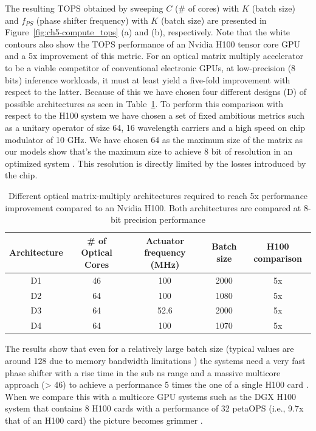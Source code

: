 The resulting TOPS obtained by sweeping $C$ (\# of cores) with $K$ (batch size) and $f_{PS}$ (phase shifter frequency) with $K$ (batch size) are presented in Figure~\ref{fig:ch5-compute_tops} (a) and (b), respectively.
Note that the white contours also show the TOPS performance of an Nvidia H100 tensor core GPU and a 5x improvement of this metric.
For an optical matrix multiply accelerator to be a viable competitor of conventional electronic GPUs, at low-precision (8 bits) inference workloads, it must at least yield a five-fold improvement with respect to the latter.
Because of this we have chosen four different designs (D) of possible architectures as seen in Table~\ref{tab:ch5-compute_tops}.
To perform this comparison with respect to the H100 system we have chosen a set of fixed ambitious metrics such as a unitary operator of size 64, 16 wavelength carriers \cite{noauthor_cw-wdm_nodate} and a high speed on chip modulator of 10 GHz.
We have chosen 64 as the maximum size of the matrix as our models show that's the maximum size to achieve 8 bit of resolution in an optimized system \cite{ward-foxton_optical_2021}.
This resolution is directly limited by the losses introduced by the chip.

\begin{table}
	\centering
	\caption{Different optical matrix-multiply architectures required to reach 5x performance improvement compared to an Nvidia H100. Both architectures are compared at 8-bit precision performance}\label{tab:ch5-compute_tops}
	\begin{tabular}{|c|c|c|c|c|}
		\hline
		Architecture & \# of Optical Cores & Actuator frequency (MHz) & Batch size & H100 comparison \\
		\hline
		D1           & 46                  & 100                      & 2000       & 5x              \\
		\hline
		D2           & 64                  & 100                      & 1080       & 5x              \\
		\hline
		D3           & 64                  & 52.6                     & 2000       & 5x              \\
		\hline
		D4           & 64                  & 100                      & 1070       & 5x              \\
		\hline
	\end{tabular}
\end{table}

The results show that even for a relatively large batch size (typical values are around 128 due to memory bandwidth limitations \cite{noauthor_llm_2023}) the systems need a very fast phase shifter with a rise time in the sub ns range and a massive multicore approach (> 46) to achieve a performance 5 times the one of a single H100 card \cite{noauthor_nvidia_nodate}.
When we compare this with a multicore GPU systems such as the DGX H100 system that contains 8 H100 cards with a performance of 32 petaOPS (i.e., 9.7x that of an H100 card) the picture becomes grimmer \cite{noauthor_nvidia_nodate-1}.

